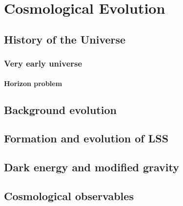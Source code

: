 \chapter{Cosmological Evolution}

\section{History of the Universe}

\subsection{Very early universe}

\subsubsection{Horizon problem}

\section{Background evolution}

\section{Formation and evolution of LSS}

\section{Dark energy and modified gravity}

\section{Cosmological observables}